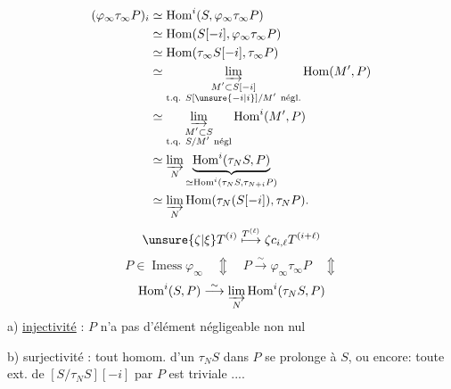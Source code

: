 \[
\begin{aligned}
(\varphi_\infty\tau_\infty P)_i
 &\simeq\operatorname{Hom}^i(S,\varphi_\infty\tau_\infty P)\\
 &\simeq\operatorname{Hom}(S[-i],\varphi_\infty\tau_\infty P)\\
 &\simeq\operatorname{Hom}(\tau_\infty S[-i],\tau_\infty P)\\
 &\simeq\underset{\substack{M'\subset S[-i]\\
 \text{t.q. }S[\unsure{-i|i}]/M'\ \text{négl.}}}{\varinjlim}
 \operatorname{Hom}(M',P)\\
 &\simeq\underset{\substack{M'\subset S\\\text{t.q. }S/M'\ \text{négl}}}{\varinjlim}
 \operatorname{Hom}^i(M',P)\\
 &\simeq\varinjlim_N
 \underbrace{\operatorname{Hom}^i(\tau_NS,P)}_{
 \simeq\operatorname{Hom}^i(\tau_NS,\tau_{N+i}P)}\\
 &\simeq\varinjlim_N\operatorname{Hom}(\tau_N(S[-i]),\tau_NP).
\end{aligned}
\]
\uuline{\hspace{10em}}
\[
\unsure{\zeta|\xi}T^{(i)}\overset{T^{(\ell)}}\longmapsto
 \zeta c_{i,\ell}T^{(i+\ell)}
\]
\[
P\in\operatorname{Imess}\varphi_\infty
\quad\Updownarrow\quad
P\overset\sim\longrightarrow\varphi_\infty\tau_\infty P
\quad\Updownarrow
\]
\[
\operatorname{Hom}^i(S,P)\overset\sim\longrightarrow
 \varinjlim_N\operatorname{Hom}^i(\tau_NS,P)
\]
a) \uline{injectivité} : \(P\) n'a pas d'élément négligeable non nul

b) surjectivité : tout homom.  d'un
 \(\tau_NS\) dans \(P\) se prolonge à \(S\), ou encore:
toute ext. de \([S/\tau_NS][-i]\) par \(P\) est triviale ....
